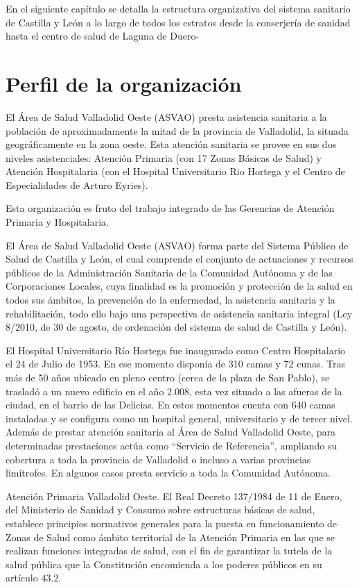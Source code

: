 En el siguiente capítulo se detalla la estructura organizativa del sistema sanitario de Castilla y León a lo largo de todos los estratos desde la conserjería de sanidad hasta el centro de salud de Laguna de Duero-

\section{Perfil de la organización}

El Área de Salud Valladolid Oeste (ASVAO) presta asistencia sanitaria a la población de aproximadamente la mitad de la provincia de Valladolid, la situada geográficamente en la zona oeste. Esta atención sanitaria se provee en sus dos niveles asistenciales: Atención Primaria (con 17 Zonas Básicas de Salud) y Atención Hospitalaria (con el Hospital Universitario Rio Hortega y el Centro de Especialidades de Arturo Eyries).

Esta organización es fruto del trabajo integrado de las Gerencias de Atención Primaria y Hospitalaria.

El Área de Salud Valladolid Oeste (ASVAO) forma parte del Sistema Público de Salud de Castilla y León, el cual comprende el conjunto de actuaciones y recursos públicos de la Administración Sanitaria de la Comunidad Autónoma y de las Corporaciones Locales, cuya finalidad es la promoción y protección de la salud en todos sus ámbitos, la prevención de la enfermedad, la asistencia sanitaria y la rehabilitación, todo ello bajo una perspectiva de asistencia sanitaria integral (Ley 8/2010, de 30 de agosto, de ordenación del sistema de salud de Castilla y León).

El Hospital Universitario Río Hortega fue inaugurado como Centro Hospitalario el 24 de Julio de 1953. En ese momento disponía de 310 camas y 72 cunas. Tras más de 50 años ubicado en pleno centro (cerca de la plaza de San Pablo), se trasladó a un nuevo edificio en el año 2.008, esta vez situado a las afueras de la ciudad, en el barrio de las Delicias. En estos momentos cuenta con 640 camas instaladas y se configura como un hospital general, universitario y de tercer nivel. Además de prestar atención sanitaria al Área de Salud Valladolid Oeste, para determinadas prestaciones actúa como “Servicio de Referencia”, ampliando su cobertura a toda la provincia de Valladolid o incluso a varias provincias limítrofes. En algunos casos presta servicio a toda la Comunidad Autónoma.

Atención Primaria Valladolid Oeste. El Real Decreto 137/1984 de 11 de Enero, del Ministerio de Sanidad y Consumo sobre estructuras básicas de salud, establece principios normativos generales para la puesta en funcionamiento de Zonas de Salud como ámbito territorial de la Atención Primaria en las que se realizan funciones integradas de salud, con el fin de garantizar la tutela de la salud pública que la Constitución encomienda a los poderes públicos en su artículo 43.2.

